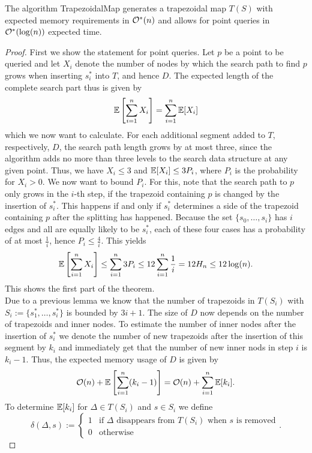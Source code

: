         \begin{theorem}
            The algorithm TrapezoidalMap generates a trapezoidal map $T(S)$ with expected memory requirements in $\mathcal{O}^\ast(n)$ and allows for point queries in $\mathcal{O}^\ast(\log(n))$ expected time. 
        \end{theorem}
        \begin{proof}
            First we show the statement for point queries. Let $p$ be a point to be queried and let $X_i$ denote the number of nodes by which the search path to find $p$ grows when inserting $s^\ast_i$ into $T$, and hence $D$. The expected length of the complete search part thus is given by
            $$\mathbb{E}\left[ \sum_{i=1}^n X_i \right] = \sum_{i=1}^n \mathbb{E}[X_i]$$
            which we now want to calculate. For each additional segment added to $T$, respectively, $D$, the search path length grows by at most three, since the algorithm adds no more than three levels to the search data structure at any given point. Thus, we have $X_i \leq 3$ and $\mathbb{E}[X_i] \leq 3P_i$, where $P_i$ is the probability for $X_i > 0$. We now want to bound $P_i$. For this, note that the search path to $p$ only grows in the $i$-th step, if the trapezoid containing $p$ is changed by the insertion of $s^\ast_i$. This happens if and only if $s^\ast_i$ determines a side of the trapezoid containing $p$ after the splitting has happened. Because the set $\{s_0, \dots, s_i\}$ has $i$ edges and all are equally likely to be $s^\ast_i$, each of these four cases has a probability of at most $\frac{1}{i}$, hence $P_i \leq \frac{4}{i}$. This yields
            $$\mathbb{E}\left[ \sum_{i=1}^n X_i \right] \leq \sum_{i=1}^n 3P_i \leq 12 \sum_{i=1}^n \frac{1}{i} = 12H_n \leq 12\log(n) .$$
            This shows the first part of the theorem. \\
            Due to a previous lemma we know that the number of trapezoids in $T(S_i)$ with $S_i := \{s^\ast_1, \dots, s^\ast_i\}$ is bounded by $3i + 1$. The size of $D$ now depends on the number of trapezoids and inner nodes. To estimate the number of inner nodes after the insertion of $s^\ast_i$ we denote the number of new trapezoids after the insertion of this segment by $k_i$ and immediately get that the number of new inner nods in step $i$ is $k_i - 1$. Thus, the expected memory usage of $D$ is given by
            $$\mathcal{O}(n) + \mathbb{E}\left[ \sum_{i=1}^n (k_i - 1) \right] = \mathcal{O}(n) + \sum_{i=1}^n \mathbb{E}[k_i] .$$
            To determine $\mathbb{E}[k_i]$ for $\Delta \in T(S_i)$ and $s \in S_i$ we define
            $$\delta(\Delta, s) := \begin{cases} 1 &\text{if $\Delta$ disappears from $T(S_i)$ when $s$ is removed} \\ 0 &\text{otherwise} \end{cases} .$$

\end{proof}
